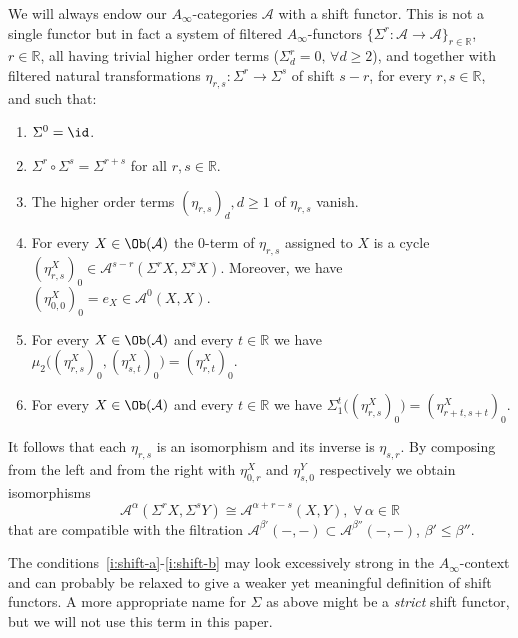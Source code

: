 We will always endow our $A_{\infty}$-categories $\mathcal{A}$ with a
shift functor. This is not a single functor but in fact a system of
filtered $A_{\infty}$-functors
$\{\Sigma^r : \mathcal{A} \longrightarrow \mathcal{A}\}_{r \in
  \mathbb{R}}$, $r \in \mathbb{R}$, all having trivial higher order
terms ($\Sigma^r_d = 0, \, \forall d \geq 2$), and together with
filtered natural transformations
$\eta_{r,s}: \Sigma^r \longrightarrow \Sigma^s$ of shift $s-r$, for
every $r,s \in \mathbb{R}$, and such that:
\begin{enumerate}
\item $\Sigma^0 = \id$. \label{i:shift-a}
\item $\Sigma^r \circ \Sigma^s = \Sigma^{r+s}$ for all $r,s \in \mathbb{R}$.
\item The higher order terms $(\eta_{r,s})_d, d \geq 1$ of
  $\eta_{r,s}$ vanish.
\item For every $X \in \Ob(\mathcal{A})$ the $0$-term of $\eta_{r,s}$
  assigned to $X$ is a cycle
  $(\eta^X_{r,s})_0 \in \mathcal{A}^{s-r}(\Sigma^rX, \Sigma^sX)$.
  Moreover, we have $(\eta^X_{0,0})_0 = e_X \in \mathcal{A}^0(X,X)$.
\item For every $X \in \Ob(\mathcal{A})$ and every $t \in \mathbb{R}$
  we have
  $\mu_2 \bigl( (\eta^X_{r,s})_0, (\eta^X_{s,t})_0 \bigr) =
  (\eta^X_{r, t})_0$.
\item For every $X \in \Ob(\mathcal{A})$ and every $t \in \mathbb{R}$
  we have
  $\Sigma_1^t \bigl( (\eta^X_{r,s})_0 \bigr) = (\eta^X_{r+t, s+t})_0$.
  \label{i:shift-b}
\end{enumerate}
It follows that each $\eta_{r,s}$ is an isomorphism and its inverse is
$\eta_{s,r}$. By composing from the left and from the right with
$\eta^X_{0,r}$ and $\eta^Y_{s,0}$ respectively we obtain isomorphisms
$$\mathcal{A}^{\alpha}(\Sigma^rX, \Sigma^sY) \cong
\mathcal{A}^{\alpha+r-s}(X,Y), \; \forall \, \alpha \in \mathbb{R}$$
that are compatible with the filtration
$\mathcal{A}^{\beta'}(- , -) \subset \mathcal{A}^{\beta''}(-,-)$,
$\beta' \leq \beta''$.


\begin{rem}
  The conditions~\eqref{i:shift-a}-\eqref{i:shift-b} may look
  excessively strong in the $A_{\infty}$-context and can probably be
  relaxed to give a weaker yet meaningful definition of shift
  functors. A more appropriate name for $\Sigma$ as above might be a
  {\em strict} shift functor, but we will not use this term in this
  paper.
\end{rem}

